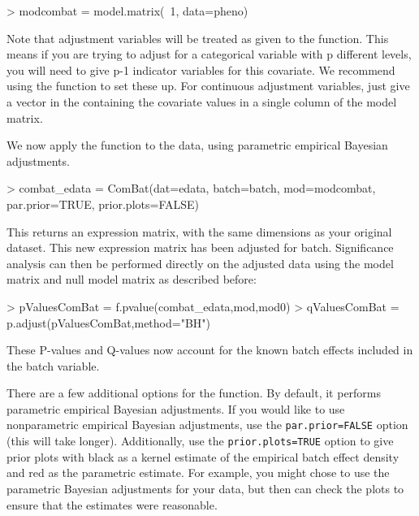 \documentclass[12pt]{article}
\begin{document}
\begin{Schunk}
\begin{Sinput}
> modcombat = model.matrix(~1, data=pheno)
\end{Sinput}
\end{Schunk}

Note that adjustment variables will be treated as given to the  function.  This means if you are trying to adjust for a categorical variable with p different levels, you will need to give  p-1 indicator variables for this covariate. We recommend using the  function to set these up. For continuous adjustment variables, just give a vector in the containing the covariate values in a single column of the model matrix.

We now apply the  function to the data, using parametric empirical Bayesian adjustments.

\begin{Schunk}
\begin{Sinput}
> combat_edata = ComBat(dat=edata, batch=batch, mod=modcombat, par.prior=TRUE, prior.plots=FALSE)
\end{Sinput}
\end{Schunk}

This returns an expression matrix, with the same dimensions as your original dataset.  This new expression matrix has been adjusted for batch. Significance analysis can then be performed directly on the adjusted data using the model matrix and null model matrix as described before:

\begin{Schunk}
\begin{Sinput}
> pValuesComBat = f.pvalue(combat_edata,mod,mod0)
> qValuesComBat = p.adjust(pValuesComBat,method="BH")
\end{Sinput}
\end{Schunk}

These P-values and Q-values now account for the known batch effects included in the batch variable. 

There are a few additional options for the  function.  By default, it performs parametric empirical Bayesian adjustments.  If you would like to use nonparametric empirical Bayesian adjustments, use the \texttt{par.prior=FALSE} option (this will take longer).  Additionally, use the \texttt{prior.plots=TRUE} option to give prior plots with black as a kernel estimate of the empirical batch effect density and red as the parametric estimate.  For example, you might chose to use the parametric Bayesian adjustments for your data, but then can check the plots to ensure that the estimates were reasonable. 
\end{document}
